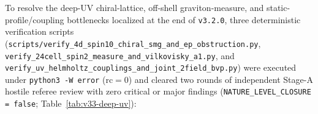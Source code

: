 \documentclass[11pt,a4paper]{article}
\begin{document}
To resolve the deep-UV chiral-lattice, off-shell graviton-measure, and static-profile/coupling bottlenecks localized at the end of \texttt{v3.2.0}, three deterministic verification scripts (\texttt{scripts/\allowbreak verify\_\allowbreak 4d\_\allowbreak spin10\_\allowbreak chiral\_\allowbreak smg\_\allowbreak and\_\allowbreak ep\_\allowbreak obstruction.py}, \texttt{verify\_\allowbreak 24cell\_\allowbreak spin2\_\allowbreak measure\_\allowbreak and\_\allowbreak vilkovisky\_\allowbreak a1.py}, and \texttt{verify\_\allowbreak uv\_\allowbreak helmholtz\_\allowbreak couplings\_\allowbreak and\_\allowbreak joint\_\allowbreak 2field\_\allowbreak bvp.py}) were executed under \texttt{python3 -W error} ($\mathrm{rc}=0$) and cleared two rounds of independent Stage-A hostile referee review with zero critical or major findings (\texttt{NATURE\_\allowbreak LEVEL\_\allowbreak CLOSURE = false}; Table~\ref{tab:v33-deep-uv}):
\end{document}
